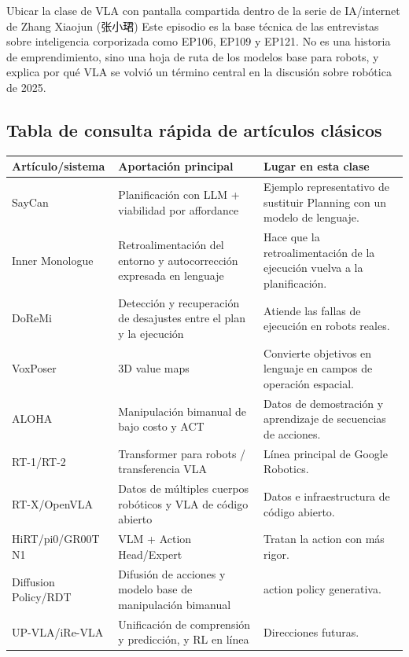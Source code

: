 \documentclass[a4paper]{article}
\begin{document}
\begin{importantbox}{Ubicar la clase de VLA con pantalla compartida dentro de la serie de IA/internet de Zhang Xiaojun (张小珺)}
Este episodio es la base técnica de las entrevistas sobre inteligencia corporizada como EP106, EP109 y EP121. No es una historia de emprendimiento, sino una hoja de ruta de los modelos base para robots, y explica por qué VLA se volvió un término central en la discusión sobre robótica de 2025.
\end{importantbox}

\subsection{Tabla de consulta rápida de artículos clásicos}

\noindent\begin{tabularx}{\textwidth}{p{}p{}X}
\toprule
Artículo/sistema & Aportación principal & Lugar en esta clase \\
\midrule
SayCan & Planificación con LLM + viabilidad por affordance & Ejemplo representativo de sustituir Planning con un modelo de lenguaje. \\
Inner Monologue & Retroalimentación del entorno y autocorrección expresada en lenguaje & Hace que la retroalimentación de la ejecución vuelva a la planificación. \\
DoReMi & Detección y recuperación de desajustes entre el plan y la ejecución & Atiende las fallas de ejecución en robots reales. \\
VoxPoser & 3D value maps & Convierte objetivos en lenguaje en campos de operación espacial. \\
ALOHA & Manipulación bimanual de bajo costo y ACT & Datos de demostración y aprendizaje de secuencias de acciones. \\
RT-1/RT-2 & Transformer para robots / transferencia VLA & Línea principal de Google Robotics. \\
RT-X/OpenVLA & Datos de múltiples cuerpos robóticos y VLA de código abierto & Datos e infraestructura de código abierto. \\
HiRT/pi0/GR00T N1 & VLM + Action Head/Expert & Tratan la action con más rigor. \\
Diffusion Policy/RDT & Difusión de acciones y modelo base de manipulación bimanual & action policy generativa. \\
UP-VLA/iRe-VLA & Unificación de comprensión y predicción, y RL en línea & Direcciones futuras. \\
\bottomrule
\end{tabularx}
\end{document}
